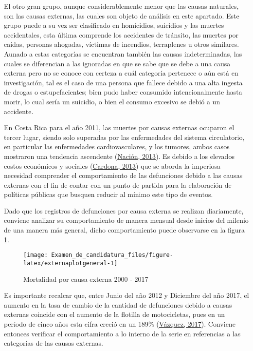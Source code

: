 \documentclass[
]{article}
\begin{document}
El otro gran grupo, aunque considerablemente menor que las causas
naturales, son las causas externas, las cuales son objeto de análisis en
este apartado. Este grupo puede a su vez ser clasificado en homicidios,
suicidios y las muertes accidentales, esta última comprende los
accidentes de tránsito, las muertes por caídas, personas ahogadas,
víctimas de incendios, terraplenes u otros similares. Aunado a estas
categorías se encuentran también las causas indeterminadas, las cuales
se diferencian a las ignoradas en que se sabe que se debe a una causa
externa pero no se conoce con certeza a cuál categoría pertenece o aún
está en investigación, tal es el caso de una persona que fallece debido
a una alta ingesta de drogas o estupefacientes; bien pudo haber
consumido intencionalmente hasta morir, lo cual sería un suicidio, o
bien el consumo excesivo se debió a un accidente.

En Costa Rica para el año 2011, las muertes por causas externas ocuparon
el tercer lugar, siendo solo superadas por las enfermedades del sistema
circulatorio, en particular las enfermedades cardiovasculares, y los
tumores, ambos casos mostraron una tendencia ascendente
(\protect\hyperlink{ref-nacion}{Nación, 2013}). Es debido a los elevados
costos económicos y sociales
(\protect\hyperlink{ref-ccpexternas}{Cardona, 2013}) que se aborda la
imperiosa necesidad comprender el comportamiento de las defunciones
debido a las causas externas con el fin de contar con un punto de
partida para la elaboración de políticas públicas que busquen reducir al
mínimo este tipo de eventos.

Dado que los registros de defunciones por causa externa se realizan
diariamente, conviene analizar su comportamiento de manera mensual desde
inicios del milenio de una manera más general, dicho comportamiento
puede observarse en la figura \ref{fig:externaplotgeneral}.

\begin{figure}[H]
\texttt{[image: Examen\_de\_candidatura\_files/figure-latex/externaplotgeneral-1]} \caption{Mortalidad por causa externa 2000 - 2017}\label{fig:externaplotgeneral}
\end{figure}

Es importante recalcar que, entre Junio del año 2012 y Diciembre del año
2017, el aumento en la tasa de cambio de la cantidad de defunciones
debido a causas externas coincide con el aumento de la flotilla de
motocicletas, pues en un período de cinco años esta cifra creció en un
189\% (\protect\hyperlink{ref-motos}{Vázquez, 2017}). Conviene entonces
verificar el comportamiento a lo interno de la serie en referencias a
las categorías de las causas externas.
\end{document}
